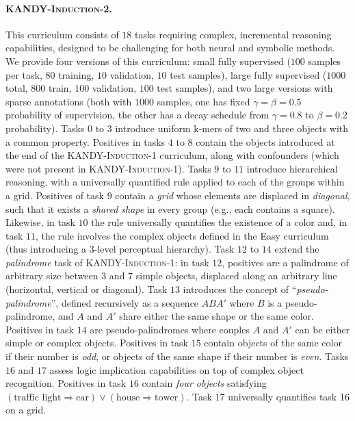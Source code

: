 \paragraph{\textsc{KANDY-Induction-2}.} This curriculum consists of $18$ tasks requiring complex, incremental reasoning capabilities, designed to be challenging for both neural and symbolic methods.
We provide four versions of this curriculum: small fully supervised ($100$ samples per task, $80$ training, $10$ validation, $10$ test samples), large fully supervised ($1000$ total, $800$ train, $100$ validation, $100$ test samples), and two large versions with sparse annotations (both with $1000$ samples, one has fixed $\gamma=\beta=0.5$ probability of supervision, the other has a decay schedule from $\gamma=0.8$ to $\beta=0.2$ probability).
%
Tasks $0$ to $3$ introduce uniform k-mers of two and three objects with a common property. %
%
Positives in tasks $4$ to $8$ contain the objects introduced at the end of the \textsc{KANDY-Induction-1} curriculum, along with confounders (which were not present in \textsc{KANDY-Induction-1}).
%
Tasks $9$ to $11$ introduce hierarchical reasoning, with a universally quantified rule applied to each of the groups within a grid. Positives of task $9$ contain a {\it grid} whose elements are displaced in {\it diagonal}, such that it exists a {\it shared shape} in every group (e.g., each contains a square). Likewise, in task $10$ the rule universally quantifies the existence of a color and, in task $11$, the rule involves the complex objects defined in the Easy curriculum (thus introducing a 3-level perceptual hierarchy).
%
Task $12$ to $14$ extend the {\it palindrome} task of \textsc{KANDY-Induction-1}: in task $12$, positives are a palindrome of arbitrary size between $3$ and $7$ simple objects, displaced along an arbitrary line (horizontal, vertical or diagonal). Task $13$ introduces the concept of ``{\it pseudo-palindrome}'', defined recursively as a sequence $A B A'$ where $B$ is a pseudo-palindrome, and $A$ and $A'$ share either the same shape or the same color. Positives in task $14$ are pseudo-palindromes where couples $A$ and $A'$ can be either simple or complex objects.
%
Positives in task $15$ contain objects of the same color if their number is {\it odd}, or objects of the same shape if their number is {\it even}.
%
Tasks $16$ and $17$ assess logic implication capabilities on top of complex object recognition. %
Positives in task $16$ contain {\it four objects} satisfying $(\text{traffic light} \Rightarrow \text{car}) \vee (\text{house} \Rightarrow \text{tower})$. Task $17$ universally quantifies task 16 on a grid. %


